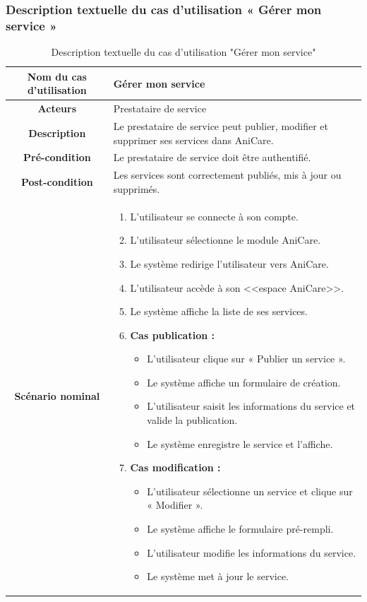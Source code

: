 \subsubsection{Description textuelle du cas d’utilisation « Gérer mon service »}
\begin{longtable}{|c|p{11cm}|}
\caption{Description textuelle du cas d'utilisation "Gérer mon service"}
\label{tab:gerer_service} \\
\hline
\cellcolor{coloranicare}\textbf{Nom du cas d'utilisation } & Gérer mon service \\
\hline
\cellcolor{coloranicare}\textbf{Acteurs} & Prestataire de service \\
\hline
\cellcolor{coloranicare}\textbf{Description } & Le prestataire de service peut publier, modifier et supprimer ses services dans AniCare. \\
\hline
\cellcolor{coloranicare}\textbf{Pré-condition } & Le prestataire de service doit être authentifié. \\
\hline
\cellcolor{coloranicare}\textbf{Post-condition } & Les services sont correctement publiés, mis à jour ou supprimés. \\
\hline

\cellcolor{coloranicare}\textbf{Scénario nominal } &
\begin{enumerate}
\item L’utilisateur se connecte à son compte.
\item L’utilisateur sélectionne le module AniCare.
\item Le système redirige l’utilisateur vers AniCare.
\item L’utilisateur accède à son <<espace AniCare>>.
\item Le système affiche la liste de ses services.

\item \textbf{Cas publication :}
\begin{itemize}
\item L’utilisateur clique sur « Publier un service ».
\item Le système affiche un formulaire de création.
\item L’utilisateur saisit les informations du service et valide la publication.
\item Le système enregistre le service et l’affiche.
\end{itemize}

\item \textbf{Cas modification :}
\begin{itemize}
\item L’utilisateur sélectionne un service et clique sur « Modifier ».
\item Le système affiche le formulaire pré-rempli.
\item L’utilisateur modifie les informations du service.
\item Le système met à jour le service.
\end{itemize}


\end{enumerate}
\end{longtable}
